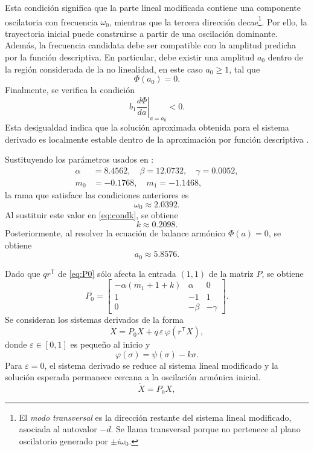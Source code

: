 \documentclass[journal]{IEEEtran}
\begin{document}
Esta condición significa que la parte lineal modificada contiene una
componente oscilatoria con frecuencia \(\omega_0\), mientras que la tercera dirección decae\footnote{El \emph{modo transversal} es la dirección restante del sistema lineal modificado, asociada al autovalor \(-d\). Se llama transversal porque no pertenece al plano oscilatorio generado por \(\pm i\omega_0\).}. Por ello, la trayectoria inicial puede construirse a partir de una oscilación dominante. Además, la frecuencia candidata debe ser compatible con la amplitud
predicha por la función descriptiva. En particular, debe existir una amplitud \(a_0\) dentro de la región considerada de la no linealidad, en este caso \(a_0\geq 1\), tal que
\[
\Phi(a_0)=0.
\]
Finalmente, se verifica la condición
\[
b_1\left.\frac{d\Phi}{da}\right|_{a=a_0}<0.
\]
Esta desigualdad indica que la solución aproximada obtenida para el sistema derivado es localmente estable dentro de la aproximación por función descriptiva \cite{GuanXie2025,KuznetsovEtAl2017}.

\noindent Sustituyendo los parámetros usados en \cite{Danca2017}:
\[
\begin{aligned}
\alpha&=8.4562,\quad \beta=12.0732,\quad \gamma=0.0052,\\
m_0&=-0.1768,\quad m_1=-1.1468,
\end{aligned}
\]
la rama que satisface las condiciones anteriores es
\[
\omega_0\approx 2.0392.
\]
Al sustituir este valor en \eqref{eq:condk}, se obtiene
\[
k\approx 0.2098.
\]
Posteriormente, al resolver la ecuación de balance armónico
\(\Phi(a)=0\), se obtiene
\[
a_0\approx 5.8576.
\]

\noindent Dado que $qr^\mathsf{T}$ de \eqref{eq:P0} sólo afecta la entrada $(1,1)$ de la matriz $P$, se obtiene
\begin{equation}\label{eq:P0_matrix}
  P_0=
\begin{bmatrix}
-\alpha(m_1+1+k) & \alpha & 0\\
1 & -1 & 1\\
0 & -\beta & -\gamma
\end{bmatrix}.
\end{equation}
Se consideran los sistemas derivados de la forma
\begin{equation}\label{eq:derived}
\dot X = P_0X + q\,\varepsilon\,\varphi(r^\mathsf{T}X),
\end{equation}
donde $\varepsilon\in[0,1]$ es pequeño al inicio y
\begin{equation}\label{eq:varphi_residual}
\varphi(\sigma)=\psi(\sigma)-k\sigma.
\end{equation}
Para \(\varepsilon=0\), el sistema derivado se reduce al sistema lineal
modificado y la solución esperada permanece cercana a la oscilación armónica inicial. 
\[
\dot X=P_0X,
\]
\end{document}
